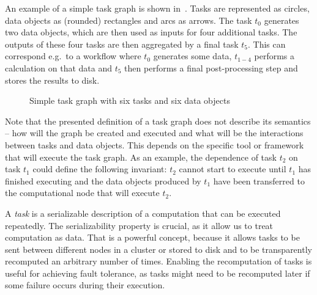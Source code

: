 
An example of a simple task graph is shown in~. Tasks are represented as
circles, data objects as (rounded) rectangles and arcs as arrows. The task $t_0$
generates two data objects, which are then used as inputs for four additional tasks. The outputs of
these four tasks are then aggregated by a final task $t_5$. This can correspond
e.g.\ to a workflow where $t_0$ generates some data, $t_{1-4}$
performs a calculation on that data and $t_5$ then performs a final
post-processing step and stores the results to disk.

\begin{figure}[h]
	\centering
	\caption{Simple task graph with six tasks and six data objects}
	\label{fig:task-graph-example}
\end{figure}

Note that the presented definition of a task graph does not describe its semantics -- how will the
graph be created and executed and what will be the interactions between tasks and data objects.
This depends on the specific tool or framework that will execute the task graph. As an example, the
dependence of task $t_2$ on task $t_1$ could define the following
invariant: $t_2$ cannot start to execute until $t_1$ has finished
executing and the data objects produced by $t_1$ have been transferred to the
computational node that will execute $t_2$.

A \emph{task} is a serializable description of a computation that can be executed
repeatedly. The serializability property is crucial, as it allow us to treat computation as data.
That is a powerful concept, because it allows tasks to be sent between different nodes in a cluster
or stored to disk and to be transparently recomputed an arbitrary number of times. Enabling the
recomputation of tasks is useful for achieving fault tolerance, as tasks might need to be
recomputed later if some failure occurs during their execution.

